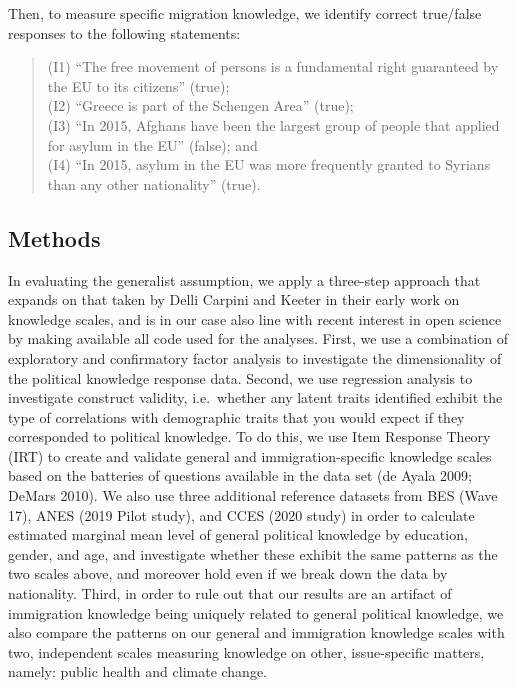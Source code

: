 \documentclass[11pt,halfline,a4paper,]{ouparticle}
\begin{document}
Then, to measure specific migration knowledge, we identify correct
true/false responses to the following statements:

\begin{quote}
(I1) ``The free movement of persons is a fundamental right guaranteed by
the EU to its citizens'' (true);\\
(I2) ``Greece is part of the Schengen Area'' (true);\\
(I3) ``In 2015, Afghans have been the largest group of people that
applied for asylum in the EU'' (false); and\\
(I4) ``In 2015, asylum in the EU was more frequently granted to Syrians
than any other nationality'' (true).
\end{quote}

\hypertarget{methods}{%
\subsection{Methods}\label{methods}}

In evaluating the generalist assumption, we apply a three-step approach
that expands on that taken by Delli Carpini and Keeter in their early
work on knowledge scales, and is in our case also line with recent
interest in open science by making available all code used for the
analyses. First, we use a combination of exploratory and confirmatory
factor analysis to investigate the dimensionality of the political
knowledge response data. Second, we use regression analysis to
investigate construct validity, i.e.~whether any latent traits
identified exhibit the type of correlations with demographic traits that
you would expect if they corresponded to political knowledge. To do
this, we use Item Response Theory (IRT) to create and validate general
and immigration-specific knowledge scales based on the batteries of
questions available in the data set (de Ayala 2009; DeMars 2010). We
also use three additional reference datasets from BES (Wave 17), ANES
(2019 Pilot study), and CCES (2020 study) in order to calculate
estimated marginal mean level of general political knowledge by
education, gender, and age, and investigate whether these exhibit the
same patterns as the two scales above, and moreover hold even if we
break down the data by nationality. Third, in order to rule out that our
results are an artifact of immigration knowledge being uniquely related
to general political knowledge, we also compare the patterns on our
general and immigration knowledge scales with two, independent scales
measuring knowledge on other, issue-specific matters, namely: public
health and climate change.
\end{document}
